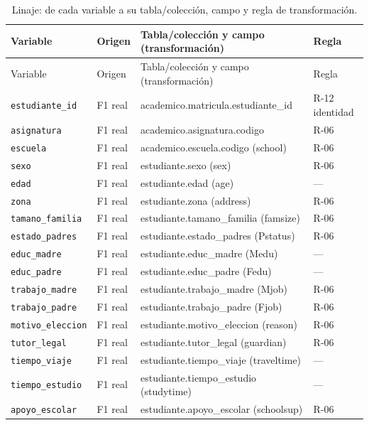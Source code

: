 {\scriptsize
\begin{longtable}{>{\raggedright\arraybackslash}p{3.9cm}>{\raggedright\arraybackslash}p{2.3cm}>{\raggedright\arraybackslash}p{6.2cm}>{\raggedright\arraybackslash}p{2.1cm}}
\caption{Linaje: de cada variable a su tabla/colección, campo y regla de transformación.}\label{tab:linaje}\\
\toprule
Variable & Origen & Tabla/colección y campo (transformación) & Regla \\
\midrule
\endfirsthead
\toprule
Variable & Origen & Tabla/colección y campo (transformación) & Regla \\
\midrule
\endhead
\texttt{estudiante\_id} & F1 real & academico.matricula.estudiante\_id & R-12 identidad \\
\texttt{asignatura} & F1 real & academico.asignatura.codigo & R-06 \\
\texttt{escuela} & F1 real & academico.escuela.codigo (school) & R-06 \\
\texttt{sexo} & F1 real & estudiante.sexo (sex) & R-06 \\
\texttt{edad} & F1 real & estudiante.edad (age) & — \\
\texttt{zona} & F1 real & estudiante.zona (address) & R-06 \\
\texttt{tamano\_familia} & F1 real & estudiante.tamano\_familia (famsize) & R-06 \\
\texttt{estado\_padres} & F1 real & estudiante.estado\_padres (Pstatus) & R-06 \\
\texttt{educ\_madre} & F1 real & estudiante.educ\_madre (Medu) & — \\
\texttt{educ\_padre} & F1 real & estudiante.educ\_padre (Fedu) & — \\
\texttt{trabajo\_madre} & F1 real & estudiante.trabajo\_madre (Mjob) & R-06 \\
\texttt{trabajo\_padre} & F1 real & estudiante.trabajo\_padre (Fjob) & R-06 \\
\texttt{motivo\_eleccion} & F1 real & estudiante.motivo\_eleccion (reason) & R-06 \\
\texttt{tutor\_legal} & F1 real & estudiante.tutor\_legal (guardian) & R-06 \\
\texttt{tiempo\_viaje} & F1 real & estudiante.tiempo\_viaje (traveltime) & — \\
\texttt{tiempo\_estudio} & F1 real & estudiante.tiempo\_estudio (studytime) & — \\
\texttt{apoyo\_escolar} & F1 real & estudiante.apoyo\_escolar (schoolsup) & R-06 \\

\end{longtable}}
